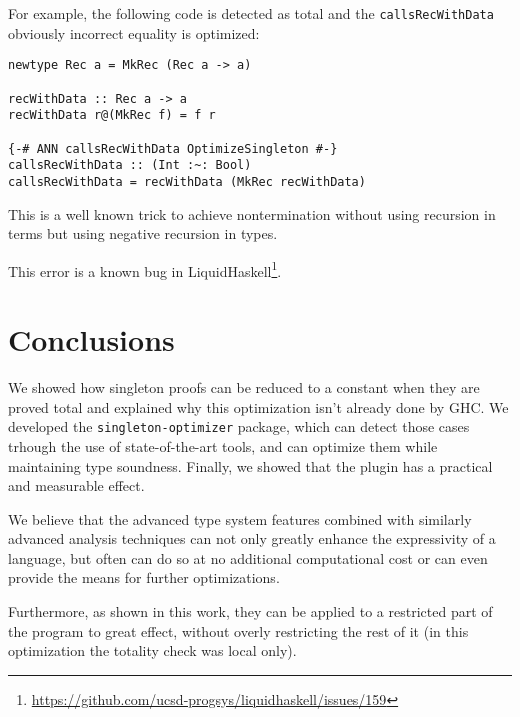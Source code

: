For example, the following code is detected as total and the \texttt{callsRecWithData} obviously incorrect equality is optimized:

\begin{lstlisting}
newtype Rec a = MkRec (Rec a -> a)

recWithData :: Rec a -> a
recWithData r@(MkRec f) = f r

{-# ANN callsRecWithData OptimizeSingleton #-}
callsRecWithData :: (Int :~: Bool)
callsRecWithData = recWithData (MkRec recWithData)
\end{lstlisting}

This is a well known trick to achieve nontermination without using recursion in terms but using negative recursion in types.

This error is a known bug in LiquidHaskell\footnote{\url{https://github.com/ucsd-progsys/liquidhaskell/issues/159}}.

\chapter{Conclusions}
\label{cha:conclusions}

We showed how singleton proofs can be reduced to a constant when they are proved total and explained why this optimization isn't already done by GHC.
We developed the \texttt{singleton-optimizer} package, which can detect those cases trhough the use of state-of-the-art tools, and can optimize them while maintaining type soundness.
Finally, we showed that the plugin has a practical and measurable effect.

We believe that the advanced type system features combined with similarly advanced analysis techniques can not only greatly enhance the expressivity of a language, but often can do so at no additional computational cost or can even provide the means for further optimizations.

Furthermore, as shown in this work, they can be applied to a restricted part of the program to great effect, without overly restricting the rest of it (in this optimization the totality check was local only).

